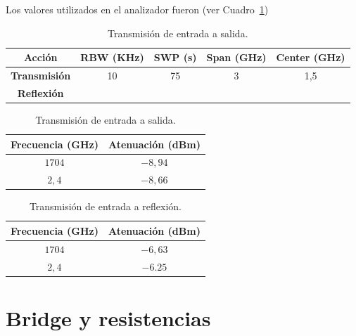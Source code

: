 \documentclass[12pt,graphicx,caption,rotating]{article}
\begin{document}
\noindent
Los valores utilizados en el analizador fueron (ver Cuadro~\ref{tab6})
\begin{table}[H]
  \centering
  \caption{Transmisión de entrada a salida.}
    \begin{tabular}{|c|c|c|c|c|}\hline
      \textbf{Acción } & \textbf{RBW (KHz) } & \textbf{SWP (s) } & \textbf{Span (GHz) } & \textbf{Center (GHz) } \\ \hline
      \textbf{Transmisión } & \multicolumn{ 1}{c|}{10} & \multicolumn{ 1}{c|}{75} & \multicolumn{ 1}{c|}{3} & \multicolumn{ 1}{c|}{1,5 } \\ \cline{ 1- 1}
      \textbf{Reflexión} & \multicolumn{ 1}{c|}{} & \multicolumn{ 1}{c|}{} & \multicolumn{ 1}{c|}{} & \multicolumn{ 1}{c|}{} \\ \hline
    \end{tabular}
  \label{tab6}
\end{table}

\begin{table}[H]
  \centering
  \caption{Transmisión de entrada a salida.}
    \begin{tabular}{|c|c|}\hline
      \textbf{Frecuencia (GHz) } & \textbf{Atenuación (dBm) } \\ \hline
      $1704$ & $−8,94 $ \\ \hline
      $2,4 $ & $−8,66 $ \\ \hline
    \end{tabular}
  \label{tab7}
\end{table}

\begin{table}[H]
  \centering
  \caption{Transmisión de entrada a reflexión.}
    \begin{tabular}{|c|c|}\hline
      \textbf{Frecuencia (GHz) } & \textbf{Atenuación (dBm) } \\ \hline
      $1704$ & $−6,63 $ \\ \hline
      $2,4 $ & $−6.25 $ \\ \hline
    \end{tabular}
  \label{tab8}
\end{table}

\section{Bridge y resistencias}
\end{document}
